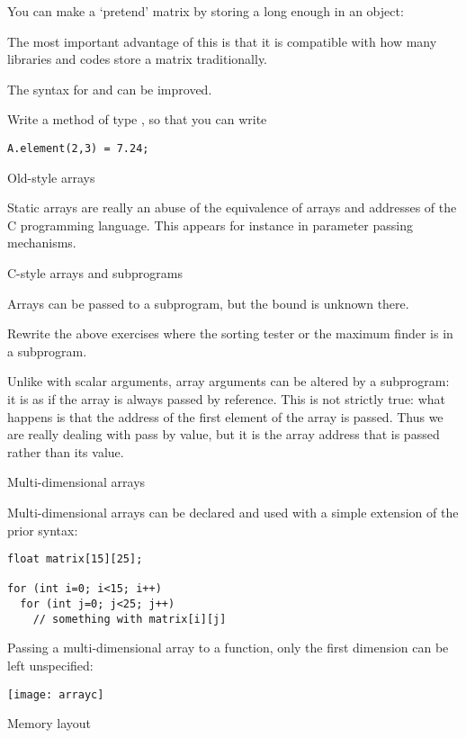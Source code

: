 You can make a `pretend' matrix by storing a long enough  in
an object:
%

The most important advantage of this is that it is compatible with how
many libraries and codes store a matrix traditionally.

The syntax for  and  can be improved.
\begin{exercise}
  Write a method  of type , so that you can write
\begin{verbatim}
A.element(2,3) = 7.24;
\end{verbatim}
\end{exercise}

 {Old-style arrays}

Static arrays are really an abuse of the equivalence of arrays and
addresses of the C programming language. This appears for instance in
parameter passing mechanisms.

 {C-style arrays and subprograms}

Arrays can be passed to a subprogram, but the bound is unknown there.
%
%
\begin{exercise}
  Rewrite the above exercises where the sorting tester or the maximum
  finder is in a subprogram.
\end{exercise}

Unlike with scalar arguments, array arguments can be altered by a
subprogram: it is as if the array is always passed by reference. This is
not strictly true: what happens is that the address of the first
element of the array is passed. Thus we are really dealing with pass
by value, but it is the array address that is passed rather than its value.

 {Multi-dimensional arrays}

Multi-dimensional arrays can be declared and used with a simple extension of
the prior syntax:
\begin{verbatim}
float matrix[15][25];

for (int i=0; i<15; i++)
  for (int j=0; j<25; j++)
    // something with matrix[i][j]
\end{verbatim}

Passing a multi-dimensional array to a function, only the first
dimension can be left unspecified:
%

\texttt{[image: arrayc]}

 {Memory layout}


